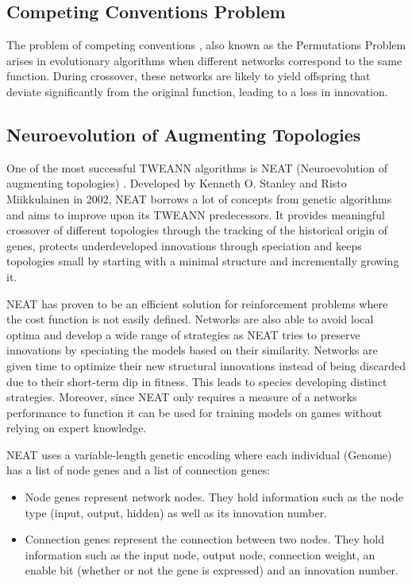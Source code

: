 \documentclass[letterpaper, 12pt]{article}
\begin{document}
\subsection*{Competing Conventions Problem}
The problem of competing conventions \cite{schafwhit}, also known as the Permutations
Problem \cite{Radcliffe1993GeneticSR} arises in evolutionary algorithms when different
networks correspond to the same function. During crossover, these networks are likely to
yield offspring that deviate significantly from the original function, leading to a loss
in innovation.

\subsection*{Neuroevolution of Augmenting Topologies}
One of the most successful TWEANN algorithms is NEAT (Neuroevolution of augmenting
topologies) \cite{stanley:ec02}. Developed by Kenneth O. Stanley and Risto Miikkulainen
in 2002, NEAT borrows a lot of concepts from genetic algorithms \cite{lamangup} and aims
to improve upon its TWEANN predecessors. It provides meaningful crossover of different
topologies through the tracking of the historical origin of genes, protects
underdeveloped innovations through speciation and keeps topologies small by starting
with a minimal structure and incrementally growing it. 

NEAT has proven to be an efficient solution for reinforcement problems where the cost
function is not easily defined. Networks are also able to avoid local optima and develop
a wide range of strategies as NEAT tries to preserve innovations by speciating the
models based on their similarity. Networks are given time to optimize their new
structural innovations instead of being discarded due to their short-term dip in
fitness. This leads to species developing distinct strategies. Moreover, since NEAT only
requires a measure of a networks performance to function it can be used for training
models on games without relying on expert knowledge.

NEAT uses a variable-length genetic encoding where each individual (Genome) has a list
of node genes and a list of connection genes:
\begin{itemize}
  \item Node genes represent network nodes. They hold information such as the node type
    (input, output, hidden) as well as its innovation number. 
  \item Connection genes represent the connection between two nodes. They hold
    information such as the input node, output node, connection weight, an enable bit
    (whether or not the gene is expressed) and an innovation number.
\end{itemize}
\end{document}
